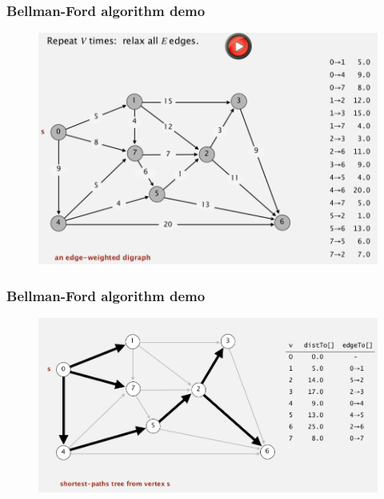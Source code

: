 \documentclass[11pt]{beamer}
\begin{document}
\begin{frame}
	\frametitle	{Bellman-Ford algorithm demo}  
    \begin{figure}
    	\centering
    	\includegraphics[width=1\linewidth]{"Screenshot 2020-12-06 at 8.54.17 PM"}
    	\label{fig:screenshot-2020-12-06-at-8}
    \end{figure}   
\end{frame}

\begin{frame}
	\frametitle	{Bellman-Ford algorithm demo}  
    \begin{figure}
    	\centering
    	\includegraphics[width=1.05\linewidth]{"Screenshot 2020-12-06 at 8.56.04 PM"}
    	\label{fig:screenshot-2020-12-06-at-8}
    \end{figure}    
\end{frame}
\end{document}
